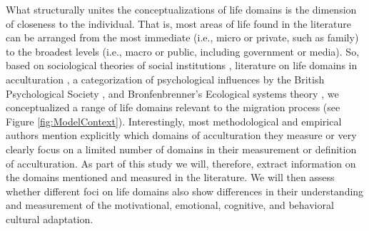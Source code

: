 \documentclass[man, 12pt, a4paper]{apa7}
\begin{document}
What structurally unites the conceptualizations of life domains is the dimension of closeness to the individual. That is, most areas of life found in the literature can be arranged from the most immediate (i.e., micro or private, such as family) to the broadest levels (i.e., macro or public, including government or media). So, based on sociological theories of social institutions \citep{Durkheim1982}, literature on life domains in acculturation \citep{Arends-Toth2006, Arends-Toth2007, Zane2004}, a categorization of psychological influences by the British Psychological Society \citep{Michie2005a}, and Bronfenbrenner's Ecological systems theory \citep{Bronfenbrenner1992}, we conceptualized a range of life domains relevant to the migration process (see Figure \ref{fig:ModelContext}). Interestingly, most methodological and empirical authors mention explicitly which domains of acculturation they measure or very clearly focus on a limited number of domains in their measurement or definition of acculturation. As part of this study we will, therefore, extract information on the domains mentioned and measured in the literature. We will then assess whether different foci on life domains also show differences in their understanding and measurement of the motivational, emotional, cognitive, and behavioral cultural adaptation.
\end{document}
